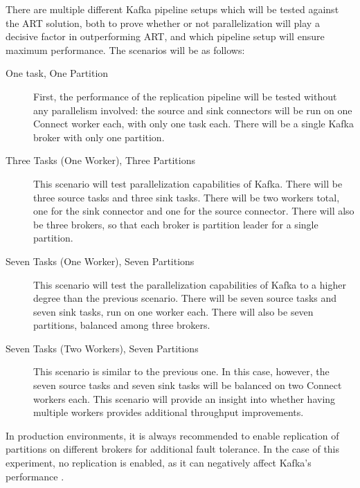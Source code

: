 There are multiple different Kafka pipeline setups which will be tested against the \ac{ART} solution, both to prove whether or not parallelization will play a decisive factor in outperforming \ac{ART}, and which pipeline setup will ensure maximum performance. The scenarios will be as follows:
\begin{description}
    \item [One task, One Partition]
    First, the performance of the replication pipeline will be tested without any parallelism involved: the source and sink connectors will be run on one Connect worker each, with only one task each. There will be a single Kafka broker with only one partition.

    \item[Three Tasks (One Worker), Three Partitions]
    This scenario will test parallelization capabilities of Kafka. There will be three source tasks and three sink tasks. There will be two workers total, one for the sink connector and one for the source connector. There will also be three brokers, so that each broker is partition leader for a single partition.

    \item[Seven Tasks (One Worker), Seven Partitions]
    This scenario will test the parallelization capabilities of Kafka to a higher degree than the previous scenario. There will be seven source tasks and seven sink tasks, run on one worker each. There will also be seven partitions, balanced among three brokers.

    \item[Seven Tasks (Two Workers), Seven Partitions]
    This scenario is similar to the previous one. In this case, however, the seven source tasks and seven sink tasks will be balanced on two Connect workers each. This scenario will provide an insight into whether having multiple workers provides additional throughput improvements.
    
    
\end{description}

In production environments, it is always recommended to enable replication of partitions on different brokers for additional fault tolerance. In the case of this experiment, no replication is enabled, as it can negatively affect Kafka's performance \cite{dobbelaerekafkavsrabbitmq}.


